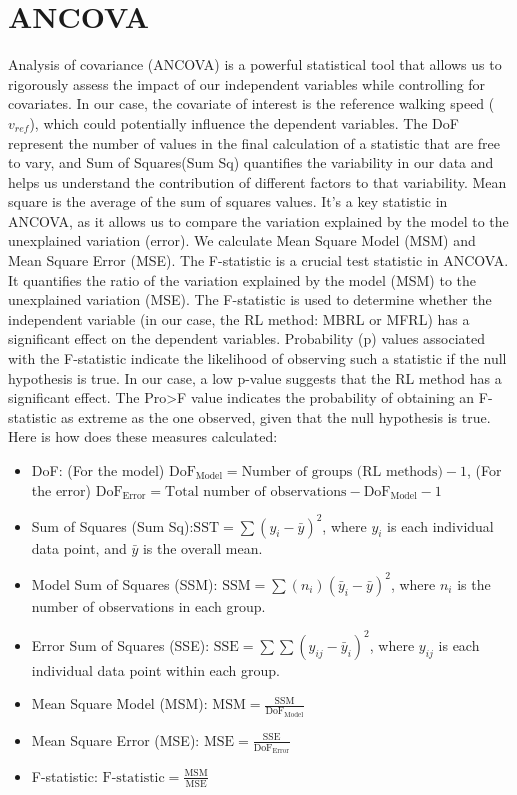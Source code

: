 \section{ANCOVA}
\label{Sec:ANCOVA}
Analysis of covariance (ANCOVA) is a powerful statistical tool that allows us to rigorously assess the impact of our independent variables while controlling for covariates.  In our case, the covariate of interest is the reference walking speed ($v_{ref}$), which could potentially influence the dependent variables. The \ac{DoF}  represent the number of values in the final calculation of a statistic that are free to vary, and Sum of Squares(Sum Sq) quantifies the variability in our data and helps us understand the contribution of different factors to that variability. Mean square is the average of the sum of squares values. It's a key statistic in ANCOVA, as it allows us to compare the variation explained by the model to the unexplained variation (error). We calculate Mean Square Model (MSM) and Mean Square Error (MSE). The F-statistic is a crucial test statistic in ANCOVA. It quantifies the ratio of the variation explained by the model (MSM) to the unexplained variation (MSE). The F-statistic is used to determine whether the independent variable (in our case, the RL method: MBRL or MFRL) has a significant effect on the dependent variables. Probability (p) values associated with the F-statistic indicate the likelihood of observing such a statistic if the null hypothesis is true. In our case, a low p-value suggests that the RL method has a significant effect. The Pro>F value indicates the probability of obtaining an F-statistic as extreme as the one observed, given that the null hypothesis is true. Here is how does these measures calculated:

\begin{itemize}
    \item \ac{DoF}: (For the model) $\text{DoF}_{\text{Model}} = \text{Number of groups (RL methods)} - 1$, (For the error) $\text{DoF}_{\text{Error}} = \text{Total number of observations} - \text{DoF}_{\text{Model}} - 1$
    \item Sum of Squares (Sum Sq):$\text{SST} = \sum(y_i - \bar{y})^2$, where $y_i$ is each individual data point, and $\bar{y}$ is the overall mean.
    \item Model Sum of Squares (SSM): $\text{SSM} = \sum(n_i)(\bar{y}_i - \bar{y})^2$,  where $n_i$ is the number of observations in each group.
    \item Error Sum of Squares (SSE): $\text{SSE} = \sum\sum(y_{ij} - \bar{y}_i)^2$, where $y_{ij}$ is each individual data point within each group.
    \item Mean Square Model (MSM): $\text{MSM} = \frac{\text{SSM}}{\text{DoF}_{\text{Model}}}$
    \item Mean Square Error (MSE): $\text{MSE} = \frac{\text{SSE}}{\text{DoF}_{\text{Error}}}$
    \item F-statistic: $\text{F-statistic} = \frac{\text{MSM}}{\text{MSE}}$
\end{itemize}

